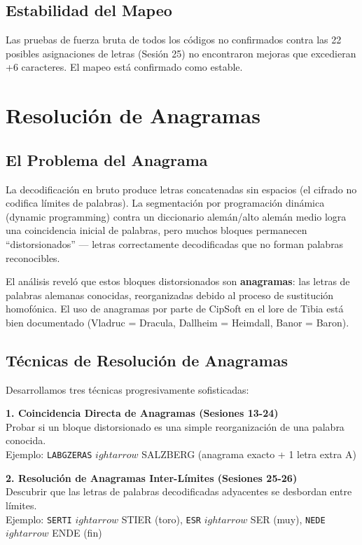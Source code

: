 \documentclass[11pt,a4paper]{article}
\begin{document}
\subsection{Estabilidad del Mapeo}

Las pruebas de fuerza bruta de todos los c\'{o}digos no confirmados contra las 22 posibles asignaciones de letras (Sesi\'{o}n 25) no encontraron mejoras que excedieran +6 caracteres. El mapeo est\'{a} confirmado como estable.

\section{Resoluci\'{o}n de Anagramas}

\subsection{El Problema del Anagrama}

La decodificaci\'{o}n en bruto produce letras concatenadas sin espacios (el cifrado no codifica l\'{i}mites de palabras). La segmentaci\'{o}n por programaci\'{o}n din\'{a}mica (dynamic programming) contra un diccionario alem\'{a}n/alto alem\'{a}n medio logra una coincidencia inicial de palabras, pero muchos bloques permanecen ``distorsionados'' --- letras correctamente decodificadas que no forman palabras reconocibles.

El an\'{a}lisis revel\'{o} que estos bloques distorsionados son \textbf{anagramas}: las letras de palabras alemanas conocidas, reorganizadas debido al proceso de sustituci\'{o}n homof\'{o}nica. El uso de anagramas por parte de CipSoft en el lore de Tibia est\'{a} bien documentado (Vladruc = Dracula, Dallheim = Heimdall, Banor = Baron).

\subsection{T\'{e}cnicas de Resoluci\'{o}n de Anagramas}

Desarrollamos tres t\'{e}cnicas progresivamente sofisticadas:

\textbf{1. Coincidencia Directa de Anagramas (Sesiones 13-24)}\\
Probar si un bloque distorsionado es una simple reorganizaci\'{o}n de una palabra conocida.\\
Ejemplo: \texttt{LABGZERAS} $
ightarrow$ SALZBERG (anagrama exacto + 1 letra extra A)

\textbf{2. Resoluci\'{o}n de Anagramas Inter-L\'{i}mites (Sesiones 25-26)}\\
Descubrir que las letras de palabras decodificadas adyacentes se desbordan entre l\'{i}mites.\\
Ejemplo: \texttt{SERTI} $
ightarrow$ STIER (toro), \texttt{ESR} $
ightarrow$ SER (muy), \texttt{NEDE} $
ightarrow$ ENDE (fin)
\end{document}

